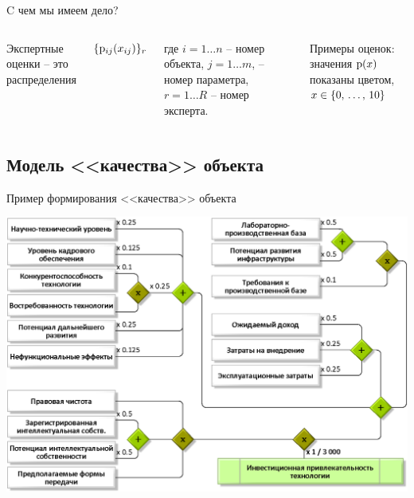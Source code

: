 \begin{frame}{C чем мы имеем дело?}
	\vspace*{3mm}
	\begin{columns}
		Экспертные оценки -- это распределения 
		{\large \begin{center} \hspace{-20mm}  $\{ {\mathrm{p}}_{ij}(x_{ij}) \}_r$ \end{center} }
		{\footnotesize где $i = 1 \ldots n$ -- номер объекта, $j = 1 \ldots m$, -- номер параметра, $r = 1 \ldots R$ -- номер эксперта}.  
		\begin{center}
		    \vspace*{-8mm}
		    {\scriptsize {Примеры оценок: значения ${\mathrm{p}}(x)$ показаны цветом, $x \in \{0,\, \ldots,\, 10\}$}}
		    \\ \vspace*{2mm}
		\end{center}
	\end{columns}
 	
\end{frame} %

\subsection{Модель <<качества>> объекта}
\begin{frame}{Пример формирования <<качества>> объекта}
	\begin{center}
		\includegraphics[width=0.9\linewidth]{./pic/schemeF2}
	\end{center}
\end{frame} %

